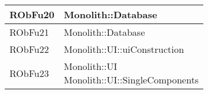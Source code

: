 \begin{center}
\begin{longtable}{|
*{1}{>{\centering\arraybackslash}m{2.5cm}|}
*{1}{>{\centering\arraybackslash}m{7.5cm}|}}
RObFu20 & \makecell[l]{Monolith::Database
\\}\\\hline
RObFu21 & \makecell[l]{Monolith::Database
\\}\\\hline
RObFu22 & \makecell[l]{Monolith::UI::uiConstruction
\\}\\\hline
RObFu23 & \makecell[l]{Monolith::UI
\\Monolith::UI::SingleComponents
\\}\\\hline
\end{longtable}
\end{center}
